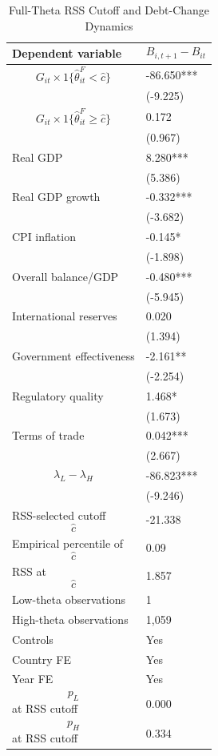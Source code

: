 \begin{table}[H]\centering
\begin{threeparttable}
\caption{Full-Theta RSS Cutoff and Debt-Change Dynamics}
\label{tab:deltaB_rss_cutoff_fulltheta}
\scriptsize
\begin{tabularx}{\textwidth}{lY}
\toprule
Dependent variable & $$B_{i,t+1}-B_{it}$$ \\
\midrule
$$G_{it}\times 1\{\widehat{\theta}^{F}_{it}<\widehat{c}\}$$ & -86.650*** \\
 & (-9.225) \\
$$G_{it}\times 1\{\widehat{\theta}^{F}_{it}\geq\widehat{c}\}$$ & 0.172 \\
 & (0.967) \\
Real GDP & 8.280*** \\
 & (5.386) \\
Real GDP growth & -0.332*** \\
 & (-3.682) \\
CPI inflation & -0.145* \\
 & (-1.898) \\
Overall balance/GDP & -0.480*** \\
 & (-5.945) \\
International reserves & 0.020 \\
 & (1.394) \\
Government effectiveness & -2.161** \\
 & (-2.254) \\
Regulatory quality & 1.468* \\
 & (1.673) \\
Terms of trade & 0.042*** \\
 & (2.667) \\
$$\lambda_L-\lambda_H$$ & -86.823*** \\
 & (-9.246) \\
\midrule
RSS-selected cutoff $$\widehat{c}$$ & -21.338 \\
Empirical percentile of $$\widehat{c}$$ & 0.09 \\
RSS at $$\widehat{c}$$ & 1.857 \\
Low-theta observations & 1 \\
High-theta observations & 1,059 \\
Controls & Yes \\
Country FE & Yes \\
Year FE & Yes \\
$$p_L$$ at RSS cutoff & 0.000 \\
$$p_H$$ at RSS cutoff & 0.334 \\

\end{tabularx}
\end{threeparttable}
\end{table}
